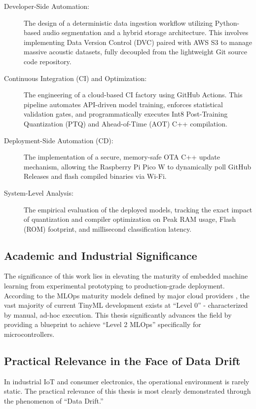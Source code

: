 \documentclass[11pt,a4paper,openany]{book}
\begin{document}
\begin{description}
    \item[Developer-Side Automation:] The design of a deterministic data ingestion workflow utilizing Python-based audio segmentation and a hybrid storage architecture. This involves implementing Data Version Control (DVC) paired with AWS S3 to manage massive acoustic datasets, fully decoupled from the lightweight Git source code repository.
    \item[Continuous Integration (CI) and Optimization:] The engineering of a cloud-based CI factory using GitHub Actions. This pipeline automates API-driven model training, enforces statistical validation gates, and programmatically executes Int8 Post-Training Quantization (PTQ) and Ahead-of-Time (AOT) C++ compilation.
    \item[Deployment-Side Automation (CD):] The implementation of a secure, memory-safe OTA C++ update mechanism, allowing the Raspberry Pi Pico W to dynamically poll GitHub Releases and flash compiled binaries via Wi-Fi.
    \item[System-Level Analysis:] The empirical evaluation of the deployed models, tracking the exact impact of quantization and compiler optimization on Peak RAM usage, Flash (ROM) footprint, and millisecond classification latency.
\end{description}

\subsection{Academic and Industrial Significance}
The significance of this work lies in elevating the maturity of embedded machine learning from experimental prototyping to production-grade deployment. According to the MLOps maturity models defined by major cloud providers \cite{9}, the vast majority of current TinyML development exists at ``Level 0'' - characterized by manual, ad-hoc execution. This thesis significantly advances the field by providing a blueprint to achieve ``Level 2 MLOps'' specifically for microcontrollers.

\subsection{Practical Relevance in the Face of Data Drift}
In industrial IoT and consumer electronics, the operational environment is rarely static. The practical relevance of this thesis is most clearly demonstrated through the phenomenon of ``Data Drift.''
\end{document}
